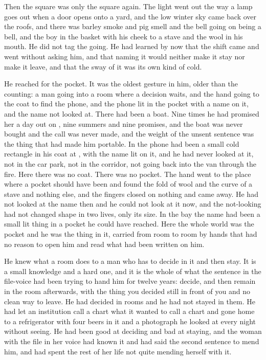 Then the square was only the square again. The light went out the way a lamp goes out when a door opens onto a yard, and the low winter sky came back over the roofs, and there was barley smoke and pig smell and the bell going on being a bell, and the boy in the basket with his cheek to a stave and the wool in his mouth. He did not tag the going. He had learned by now that the shift came and went without asking him, and that naming it would neither make it stay nor make it leave, and that the sway of it was its own kind of cold.

He reached for the pocket. It was the oldest gesture in him, older than the counting: a man going into a room where a decision waits, and the hand going to the coat to find the phone, and the phone lit in the pocket with a name on it, and the name not looked at. There had been a boat. Nine times he had promised her a day out on , nine summers and nine promises, and the boat was never bought and the call was never made, and the weight of the unsent sentence was the thing that had made him portable. In  the phone had been a small cold rectangle in his coat at , with the name lit on it, and he had never looked at it, not in the car park, not in the corridor, not going back into the van through the fire. Here there was no coat. There was no pocket. The hand went to the place where a pocket should have been and found the fold of wool and the curve of a stave and nothing else, and the fingers closed on nothing and came away. He had not looked at the name then and he could not look at it now, and the not-looking had not changed shape in two lives, only its size. In the bay the name had been a small lit thing in a pocket he could have reached. Here the whole world was the pocket and he was the thing in it, carried from room to room by hands that had no reason to open him and read what had been written on him.

He knew what a room does to a man who has to decide in it and then stay. It is a small knowledge and a hard one, and it is the whole of what the sentence in the file-voice had been trying to hand him for twelve years: decide, and then remain in the room afterwards, with the thing you decided still in front of you and no clean way to leave. He had decided in rooms and he had not stayed in them. He had let an institution call a chart what it wanted to call a chart and gone home to a refrigerator with four beers in it and a photograph he looked at every night without seeing. He had been good at deciding and bad at staying, and the woman with the file in her voice had known it and had said the second sentence to mend him, and had spent the rest of her life not quite mending herself with it.

